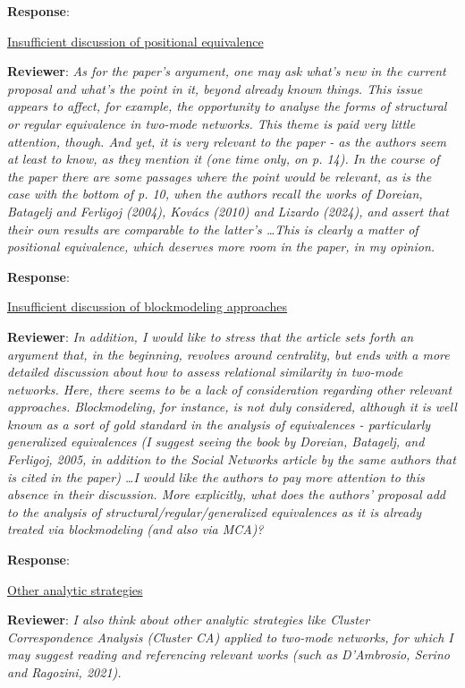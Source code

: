 \documentclass{article}
\begin{document}
\textbf{Response}:

\underline{Insufficient discussion of positional equivalence}

\textbf{Reviewer}: \textit{As for the paper's argument, one may ask what's new in the current proposal and what's the point in it, beyond already known things. This issue appears to affect, for example, the opportunity to analyse the forms of structural or regular equivalence in two-mode networks. This theme is paid very little attention, though. And yet, it is very relevant to the paper - as the authors seem at least to know, as they mention it (one time only, on p. 14). In the course of the paper there are some passages where the point would be relevant, as is the case with the bottom of p. 10, when the authors recall the works of Doreian, Batagelj and Ferligoj (2004), Kovács (2010) and Lizardo (2024), and assert that their own results are comparable to the latter's \ldots This is clearly a matter of positional equivalence, which deserves more room in the paper, in my opinion.}

\textbf{Response}:

\underline{Insufficient discussion of blockmodeling approaches}

\textbf{Reviewer}: \textit{In addition, I would like to stress that the article sets forth an argument that, in the beginning, revolves around centrality, but ends with a more detailed discussion about how to assess relational similarity in two-mode networks. Here, there seems to be a lack of consideration regarding other relevant approaches. Blockmodeling, for instance, is not duly considered, although it is well known as a sort of gold standard in the analysis of equivalences - particularly generalized equivalences (I suggest seeing the book by Doreian, Batagelj, and Ferligoj, 2005, in addition to the Social Networks article by the same authors that is cited in the paper) \ldots I would like the authors to pay more attention to this absence in their discussion. More explicitly, what does the authors' proposal add to the analysis of structural/regular/generalized equivalences as it is already treated via blockmodeling (and also via MCA)?}

\textbf{Response}:

\underline{Other analytic strategies}

\textbf{Reviewer}: \textit{I also think about other analytic strategies like Cluster Correspondence Analysis (Cluster CA) applied to two-mode networks, for which I may suggest reading and referencing relevant works (such as D'Ambrosio, Serino and Ragozini, 2021).}
\end{document}
